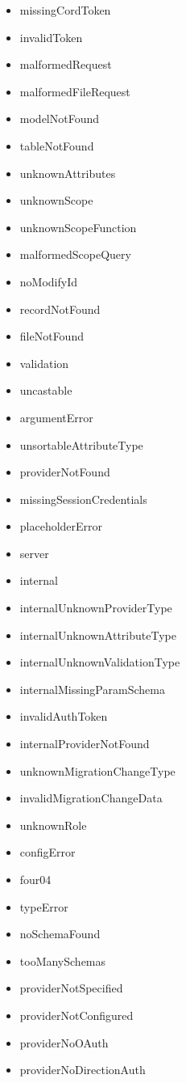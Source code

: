 \documentclass[
  12pt,
]{article}
\begin{document}
\begin{multicols}{2}
\begin{itemize}
\item missingCordToken
\item invalidToken
\item malformedRequest
\item malformedFileRequest
\item modelNotFound
\item tableNotFound
\item unknownAttributes
\item unknownScope
\item unknownScopeFunction
\item malformedScopeQuery
\item noModifyId
\item recordNotFound
\item fileNotFound
\item validation
\item uncastable
\item argumentError
\item unsortableAttributeType
\item providerNotFound
\item missingSessionCredentials
\item placeholderError
\item server
\item internal
\item internalUnknownProviderType
\item internalUnknownAttributeType
\item internalUnknownValidationType
\item internalMissingParamSchema
\item invalidAuthToken
\item internalProviderNotFound
\item unknownMigrationChangeType
\item invalidMigrationChangeData
\item unknownRole
\item configError
\item four04
\item typeError
\item noSchemaFound
\item tooManySchemas
\item providerNotSpecified
\item providerNotConfigured
\item providerNoOAuth
\item providerNoDirectionAuth

\end{itemize}
\end{multicols}
\end{document}
